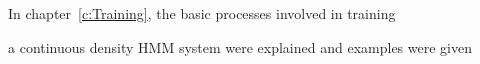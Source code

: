 



































%




%












In chapter~\ref{c:Training}, the basic processes involved in training


a continuous density HMM system were explained and examples were given


